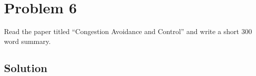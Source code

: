 
\section*{Problem 6}

Read the paper titled ``Congestion Avoidance and Control'' and write a short 300 word summary.

\subsection*{Solution}

